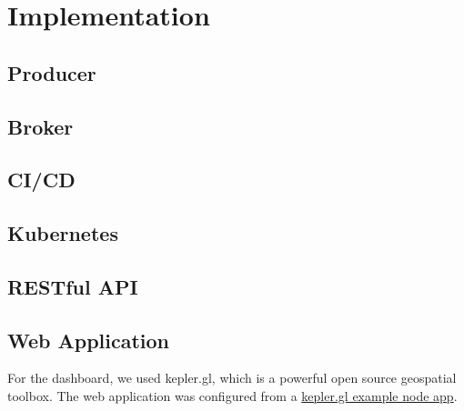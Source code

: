 \section{Implementation}
\subsection{Producer}
\cite{weatherbit}
\subsection{Broker}
\subsection{CI/CD}
\cite{jenkins}

\subsection{Kubernetes}

\subsection{RESTful API}

\subsection{Web Application}
For the dashboard, we used kepler.gl, which is a powerful open source geospatial toolbox. 
\cite{kepler}
The web application was configured from a \href{https://github.com/keplergl/kepler.gl/tree/master/examples/node-app}{kepler.gl example node app}.